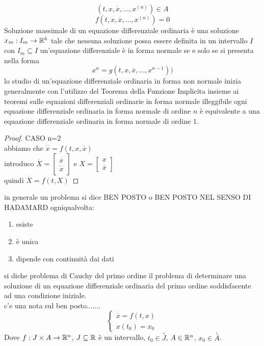 $$ (t,x,\overset{\cdot}{x},\ldots,x^{(n)}) \in A$$
$$ f(t,x,\overset{\cdot}{x},\ldots,x^{(n)})=0$$
Soluzione massimale  di un equazione differenziale ordinaria è una soluzione $x_m:I_m\to \mathbb{R}^k$ tale che nessuna soluzione possa essere definita in un intervallo $I$ con $I_m\subseteq I$
un'equazione differenziale è in forma normale  se e solo se si presenta nella forma 
$$x^n = g(t,x,\overset{\cdot}{x},\ldots,x^{n-1}))$$
\observation
lo studio di un'equazione differenziale ordinaria in forma non normale inizia generalmente con l'utilizzo del Teorema della Funzione Implicita insieme ai teoremi sulle equazioni differenziali ordinarie in forma normale
\observation
illeggibile
\proposition
ogni equazione differenziale ordinaria  in forma normale di ordine $n$ è equivalente a una equazione differenziale ordinaria in forma normale di ordine $1$.\\
\begin{proof}
CASO n=2\\
abbiamo che $\overset{\cdot\cdot}{x}=f(t,x,\overset{\cdot}{x})$\\
introduco $\overset{\cdot}{X}=\begin{bmatrix}\overset{\cdot}{x}\\\overset{\cdot\cdot}{x}\end{bmatrix}$ e $X=\begin{bmatrix}x\\\overset{\cdot}{x}\end{bmatrix}$\\
quindi $\overset{\cdot}{X}=f(t,X)$
\end{proof} 
\observation
in generale un problema si dice BEN POSTO o BEN POSTO NEL SENSO DI HADAMARD ogniqualvolta:
\begin{enumerate}
	\item esiste
	\item è unica
	\item dipende con continuità dai dati
\end{enumerate} 
si diche problema di Cauchy del primo ordine il problema di determinare una soluzione di un equazione differenziale ordinaria del primo ordine soddisfacente ad una condizione iniziale.\\
c'e una nota sul ben posto.......\\
$$\left\{\begin{matrix}
\overset{\cdot}{x}=f(t,x)\\x(t_0)=x_0
\end{matrix}\right.$$
Dove $f:J\times A\to \mathbb{R}^n$, $J\subseteq \mathbb{R}$ è un intervallo, $t_0\in\overset{\circ}{J}$, $A\in \mathbb{R}^n$, $x_0\in\overset{\circ}{A}$.\\
